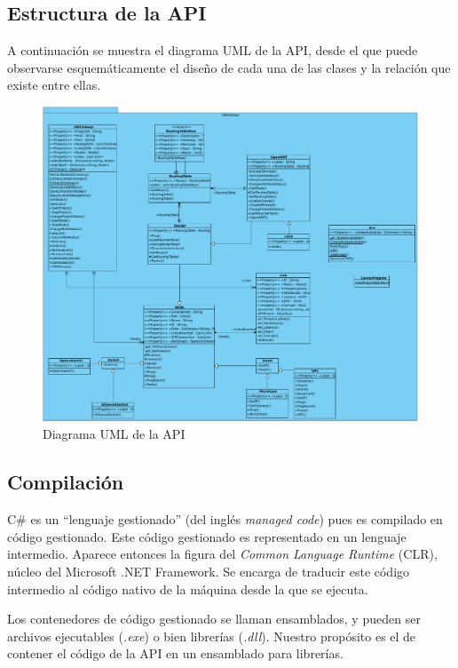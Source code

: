 \subsection{Estructura de la API}
A continuación se muestra el diagrama UML de la API, desde el que puede observarse esquemáticamente el diseño de cada una de las clases y la relación que existe entre ellas.

\begin{figure}[h]
  \centering
  \includegraphics[scale=0.4]{imagenes/diagrama_api2}
  \caption{Diagrama UML de la API}
  \label{fig:uml_api}
\end{figure}

\subsection{Compilación}
C\# es un ``lenguaje gestionado'' (del inglés \textit{managed code}) pues es compilado en código gestionado. Este código gestionado es representado en un lenguaje intermedio. Aparece entonces la figura del \textit{Common Language Runtime} (CLR), núcleo del Microsoft .NET Framework. Se encarga de traducir este código intermedio al código nativo de la máquina desde la que se ejecuta.

Los contenedores de código gestionado se llaman ensamblados, y pueden ser archivos ejecutables (\textit{.exe}) o bien librerías (\textit{.dll})\cite{csnutshell}. Nuestro propósito es el de contener el código de la API en un ensamblado para librerías.

